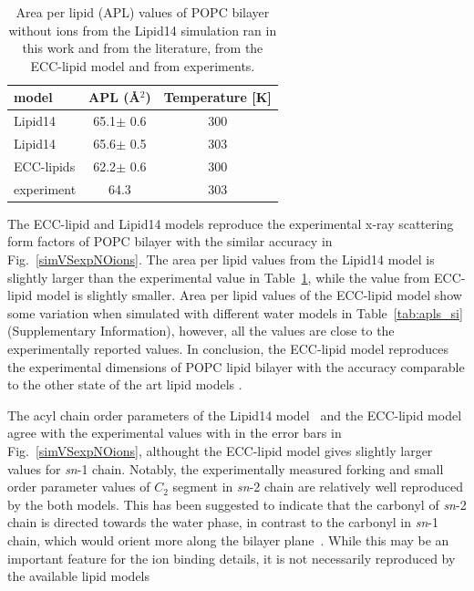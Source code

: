 \documentclass[aip,jcp,twocolumn]{revtex4}
\begin{document}
\begin{table}
  \caption{Area per lipid (APL) values of POPC bilayer without ions from the Lipid14 simulation
    ran in this work and from the literature, from the ECC-lipid model and from experiments.\label{tab:apls} }
  \begin{tabular}{l|c c}
    model          & APL (\AA$^2$)   & Temperature [K] \\
    \hline
    Lipid14                   & 65.1$\pm$ 0.6  &  300 \\
    Lipid14 \cite{dickson14}  & 65.6$\pm$ 0.5  &  303 \\
    \hline
    ECC-lipids                & 62.2$\pm$ 0.6  &  300       \\
    \hline
    experiment \cite{kucerka11} & 64.3  &  303    \\
    \hline
  \end{tabular}
\end{table}


The ECC-lipid and Lipid14 models reproduce the experimental x-ray scattering form factors
of POPC bilayer with the similar accuracy in Fig.~\ref{simVSexpNOions}.
The area per lipid values from the Lipid14 model is slightly larger than the
experimental value in Table~\ref{tab:apls}, while the value from ECC-lipid model
is slightly smaller. Area per lipid values of the ECC-lipid model show some variation
when simulated with different water models in Table~\ref{tab:apls_si} (Supplementary Information),
however, all the values are close to the experimentally reported values.
In conclusion, the ECC-lipid model reproduces the experimental dimensions of POPC
lipid bilayer with the accuracy comparable to the other state of the art lipid models \cite{ollila16}.

The acyl chain order parameters of the Lipid14 model~\cite{dickson14} and the
ECC-lipid model agree with the experimental values with in the error bars
in Fig.~\ref{simVSexpNOions}, althought the ECC-lipid model gives slightly larger
values for {\it sn}-1 chain. Notably, the experimentally measured forking and
small order parameter values of $C_2$ segment in {\it sn}-2 chain are relatively well
reproduced by the both models. This has been suggested to indicate that the carbonyl
of {\it sn}-2 chain is directed towards the water phase, in contrast to the
carbonyl in {\it sn}-1 chain, which would orient more along the bilayer
plane~\cite{seelig75,schindler75,gawrisch92}. While this may be an important
feature for the ion binding details, it is not necessarily reproduced by the
available lipid models~\cite{ollila16}
\end{document}

